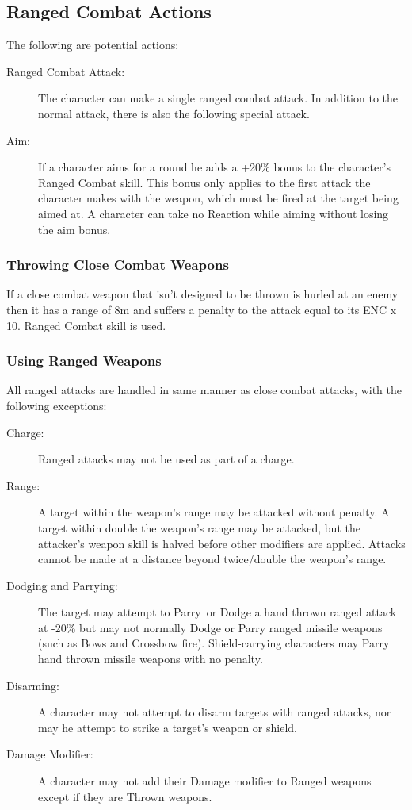 \subsection{Ranged Combat Actions}

The following are potential actions:
\begin{description}
\item[Ranged Combat Attack:] The character can make a single ranged combat attack. In addition to the normal attack, there is also the following special attack.
\item[Aim:] If a character aims for a round he adds a +20\% bonus to the character’s Ranged Combat skill. This bonus only applies to the first attack the character makes with the weapon, which must be fired at the target being aimed at. A character can take no Reaction while aiming without losing the aim bonus.
\end{description}

\subsubsection{Throwing Close Combat Weapons}
If a close combat weapon that isn’t designed to be thrown is hurled at an enemy then it has a range of 8m and suffers a penalty to the attack equal to its ENC x 10. Ranged Combat skill is used. 

\subsubsection{Using Ranged Weapons}
All ranged attacks are handled in same manner as close combat attacks, with the following exceptions: 
\begin{description}
\item[Charge:] Ranged attacks may not be used as part of a charge.
\item[Range:] A target within the weapon’s range may be attacked without penalty. A target within double the weapon’s range may be attacked, but the attacker’s weapon skill is halved before other modifiers are applied. Attacks cannot be made at a distance beyond twice/double the weapon’s range.
\item[Dodging and Parrying:] The target may attempt to Parry or Dodge a hand thrown ranged attack at -20\% but may not normally Dodge or Parry ranged missile weapons (such as Bows and Crossbow fire). Shield-carrying characters may Parry hand thrown missile weapons with no penalty.
\item[Disarming:] A character may not attempt to disarm targets with ranged attacks, nor may he attempt to strike a target’s weapon or shield.
\item[Damage Modifier:] A character may not add their Damage modifier to Ranged weapons except if they are Thrown weapons.

\end{description}

